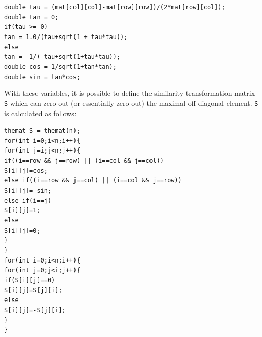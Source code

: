 \documentclass[12pt]{article}
\numberwithin{equation}{section}
\begin{document}
\vspace{0.4cm}
\begin{1stlisting}
\noindent\texttt{double tau = (mat[col][col]-mat[row][row])/(2*mat[row][col]);} \\
\texttt{double tan = 0;} \\
\texttt{if(tau >= 0)} \\
\indent \texttt{tan = 1.0/(tau+sqrt(1 + tau*tau));} \\
\texttt{else} \\
\indent \texttt{tan = -1/(-tau+sqrt(1+tau*tau));} \\
\texttt{double cos = 1/sqrt(1+tan*tan);} \\
\texttt{double sin = tan*cos;}
\end{1stlisting}

\noindent With these variables, it is possible to define the similarity transformation matrix \texttt{S} which can zero out (or essentially zero out) the maximal off-diagonal element.  \texttt{S} is calculated as follows:

\vspace{0.4cm}
\begin{1stlisting}
\noindent\texttt{themat S = themat(n);} \\
\texttt{for(int i=0;i<n;i++)\{} \\
\indent\texttt{for(int j=i;j<n;j++)\{}\\
\indent\indent\texttt{if((i==row \&\& j==row) || (i==col \&\& j==col))} \\
\indent\indent\indent\texttt{S[i][j]=cos;} \\
\indent\indent\texttt{else if((i==row \&\& j==col) || (i==col \&\& j==row))} \\
\indent\indent\indent\texttt{S[i][j]=-sin;} \\
\indent\indent\texttt{else if(i==j)} \\
\indent\indent\indent\texttt{S[i][j]=1;} \\
\indent\indent\texttt{else} \\
\indent\indent\indent\texttt{S[i][j]=0;} \\
\indent\texttt{\}}\\
\texttt{\}} \\
\texttt{for(int i=0;i<n;i++)\{} \\
\indent\texttt{for(int j=0;j<i;j++)\{} \\
\indent\indent\texttt{if(S[i][j]==0)} \\
\indent\indent\indent\texttt{S[i][j]=S[j][i];} \\
\indent\indent\texttt{else} \\
\indent\indent\indent\texttt{S[i][j]=-S[j][i];} \\
\indent\texttt{\}} \\
\texttt{\}}
\end{1stlisting}
\end{document}
